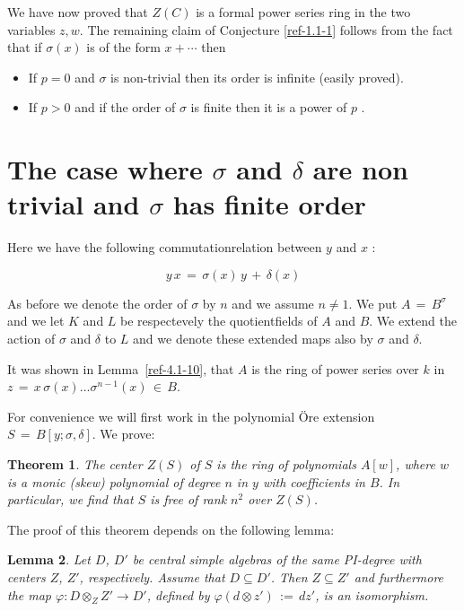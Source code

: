 \documentclass{amsart}
\numberwithin{equation}{section}
\newtheorem{lemma}{Lemma}[section]
\newtheorem{theorem}[lemma]{Theorem}
\theoremstyle{definition}
\theoremstyle{remark}
\begin{document}
  We have now proved that $Z(C)$ is a formal power series ring in the two
  variables $z,w$.  The remaining claim of
  Conjecture \ref{ref-1.1-1}  follows from the fact that if
  $\sigma(x)$ is of the form $x+\cdots$ then
\begin{itemize}
\item If $p=0$ and $\sigma$ is non-trivial then its order is infinite  (easily proved).
\item If $p>0$ and if the order  of $\sigma$ is finite then it is a power of $p$ \cite{SS}.
\end{itemize}


\section{The case where $\sigma$ and $\delta$ are non trivial and
  $\sigma$ has finite order} \label{ref-5-11}


Here we have the following commutationrelation between $y$ and $x$ :

\begin{equation} \label{ref-5.1-12}
    y \, x \,=\, \sigma(x) \, y \,+\, \delta(x)
\end{equation}

As before we denote the order of $\sigma$ by $n$ and we assume $n 
\neq 1$.
 We put $A \,=\, B^{\sigma}$ and we let $K$ and $L$ be respectevely the 
quotientfields of $A$ and  $B$.
We  extend the action of $\sigma$ and $\delta$ to $L$ and we denote
these  extended maps also by $\sigma$ and $\delta$.

 It was shown in  Lemma~\ref{ref-4.1-10}, that $A$ is 
the ring of power series over $k$ in 
\\ $z \,=\, x\,\sigma(x) \ldots 
\sigma^{n-1}(x) \,\in\, B$.

For convenience we will first work in the polynomial \"Ore extension
$S \,=\, B[y;\sigma,\delta]$.  We prove:

\begin{theorem} \label{ref-5.1-13}
    The center $Z(S)$ of $S$ is the ring of polynomials $A[w]$, 
    where $w$ is a monic (skew) polynomial of degree $n$ in $y$ with 
    coefficients in $B$. In particular, we find that $S$ is free of rank $n^{2}$ over 
    $Z(S)$.
\end{theorem}

The proof of this theorem depends on the following lemma:

\begin{lemma} \label{ref-5.2-14}
    Let $D$, $D'$ be central simple algebras of the same PI-degree 
    with centers $Z$, $Z'$, respectively. Assume that $D \subseteq D'$.
    Then $Z\subseteq Z'$ and furthermore the map $\varphi : D \otimes_{Z} Z' \rightarrow D'$, 
    defined by $\varphi(d \otimes z') \,:=\, dz'$, is an 
    isomorphism.
\end{lemma}
\end{document}
